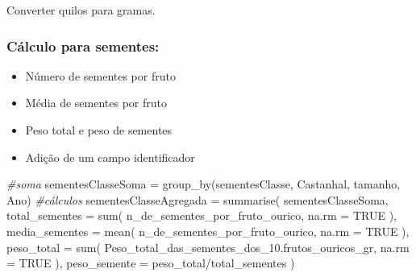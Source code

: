 \documentclass[
]{article}
\newenvironment{Shaded}{\begin{snugshade}}{\end{snugshade}}
\newcommand{\AttributeTok}[1]{\textcolor[rgb]{0.77,0.63,0.00}{#1}}
\newcommand{\CommentTok}[1]{\textcolor[rgb]{0.56,0.35,0.01}{\textit{#1}}}
\newcommand{\ConstantTok}[1]{\textcolor[rgb]{0.00,0.00,0.00}{#1}}
\newcommand{\DecValTok}[1]{\textcolor[rgb]{0.00,0.00,0.81}{#1}}
\newcommand{\FunctionTok}[1]{\textcolor[rgb]{0.00,0.00,0.00}{#1}}
\newcommand{\NormalTok}[1]{#1}
\newcommand{\OtherTok}[1]{\textcolor[rgb]{0.56,0.35,0.01}{#1}}
\newcommand{\SpecialCharTok}[1]{\textcolor[rgb]{0.00,0.00,0.00}{#1}}
\begin{document}
Converter quilos para gramas.

\begin{Shaded}
\end{Shaded}

\hypertarget{cuxe1lculo-para-sementes}{%
\subsubsection{Cálculo para sementes:}\label{cuxe1lculo-para-sementes}}

\begin{itemize}
\item
  Número de sementes por fruto
\item
  Média de sementes por fruto
\item
  Peso total e peso de sementes
\item
  Adição de um campo identificador
\end{itemize}

\begin{Shaded}
\begin{Highlighting}[]
\CommentTok{\#soma}
\NormalTok{sementesClasseSoma }\OtherTok{=} \FunctionTok{group\_by}\NormalTok{(sementesClasse, Castanhal, tamanho, Ano)}
\CommentTok{\#cálculos}
\NormalTok{sementesClasseAgregada }\OtherTok{=} \FunctionTok{summarise}\NormalTok{(}
\NormalTok{    sementesClasseSoma,}
    \AttributeTok{total\_sementes =} \FunctionTok{sum}\NormalTok{(}
\NormalTok{        n\_de\_sementes\_por\_fruto\_ourico,}
        \AttributeTok{na.rm =} \ConstantTok{TRUE}
\NormalTok{    ),}
    \AttributeTok{media\_sementes =} \FunctionTok{mean}\NormalTok{(}
\NormalTok{        n\_de\_sementes\_por\_fruto\_ourico,}
        \AttributeTok{na.rm =} \ConstantTok{TRUE}
\NormalTok{    ),}
    \AttributeTok{peso\_total =} \FunctionTok{sum}\NormalTok{(}
\NormalTok{        Peso\_total\_das\_sementes\_dos\_10.frutos\_ouricos\_gr,}
        \AttributeTok{na.rm =} \ConstantTok{TRUE}
\NormalTok{    ),}
    \AttributeTok{peso\_semente =}\NormalTok{  peso\_total}\SpecialCharTok{/}\NormalTok{total\_sementes}
\NormalTok{)}
\end{Highlighting}
\end{Shaded}
\end{document}
